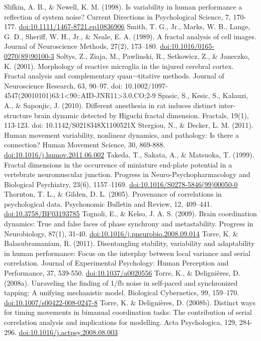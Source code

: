 \documentclass[12pt,]{book}
\begin{document}
Slifkin, A. B., \& Newell, K. M. (1998). Is variability in human performance a reflection of system noise? Current Directions in Psychological Science, 7, 170-177. \url{doi:10.1111/1467-8721.ep10836906}
Smith, T. G., Jr., Marks, W. B., Lange, G. D., Sheriff, W. H., Jr., \& Neale, E. A. (1989). A fractal analysis of cell images. Journal of Neuroscience Methods, 27(2), 173--180. \url{doi:10.1016/0165-0270(89)90100-3}
Soltys, Z., Ziaja, M., Pawlinski, R., Setkowicz, Z., \& Janeczko, K. (2001). Morphology of reactive microglia in the injured cerebral cortex. Fractal analysis and complementary quan¬titative methods. Journal of Neuroscience Research, 63, 90--97. doi: 10.1002/1097-4547(20010101)63:1\textless{}90::AID-JNR11\textgreater{}3.0.CO;2-9
Spasic, S., Kesic, S., Kalauzi, A., \& Saponjic, J. (2010). Different anesthesia in rat induces distinct inter-structure brain dynamic detected by Higuchi fractal dimension. Fractals, 19(1), 113-123. doi: 10.1142/S0218348X1100521X
Stergiou, N., \& Decker, L. M. (2011). Human movement variability, nonlinear dynamics, and pathology: Is there a connection? Human Movement Science, 30, 869-888. \url{doi:10.1016/j.humov.2011.06.002}
Takeda, T., Sakata, A., \& Matsuoka, T. (1999). Fractal dimensions in the occurrence of miniature end-plate potential in a vertebrate neuromuscular junction. Progress in Neuro-Psychopharmacology and Biological Psychiatry, 23(6), 1157--1169. \url{doi:10.1016/S0278-5846(99)00050-0}
Thornton, T. L., \& Gilden, D. L. (2005). Provenance of correlations in psychological data. Psychonomic Bulletin and Review, 12, 409--441. \url{doi:10.3758/BF03193785}
Tognoli, E., \& Kelso, J. A. S. (2009). Brain coordination dynamics: True and false faces of phase synchrony and metastability. Progress in Neurobiology, 87(1), 31-40. \url{doi:10.1016/j.pneurobio.2008.09.014}
Torre, K. \& Balasubramaniam, R. (2011). Disentangling stability, variability and adaptability in human performance: Focus on the interplay between local variance and serial correlation. Journal of Experimental Psychology: Human Perception and Performance, 37, 539-550. \url{doi:10.1037/a0020556}
Torre, K., \& Delignières, D. (2008a). Unraveling the finding of 1/fb noise in self-paced and synchronized tapping: A unifying mechanistic model. Biological Cybernetics, 99, 159--170. \url{doi:10.1007/s00422-008-0247-8}
Torre, K. \& Delignières, D. (2008b). Distinct ways for timing movements in bimanual coordination tasks: The contribution of serial correlation analysis and implications for modelling. Acta Psychologica, 129, 284-296. \url{doi:10.1016/j.actpsy.2008.08.003}
\end{document}
